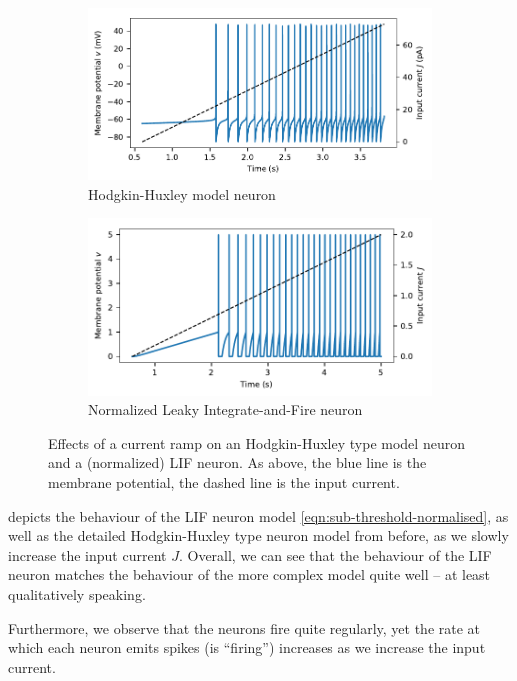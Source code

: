 \documentclass[10pt,letterpaper,oneside]{article}
\begin{document}
\begin{figure}[t]
	\begin{subfigure}{\textwidth}
		\centering
		\includegraphics{media/hh_neuron_ramp.pdf}
		\caption{Hodgkin-Huxley model neuron}
	\end{subfigure}
	\begin{subfigure}{\textwidth}
		\centering
		\includegraphics{media/lif_neuron_ramp.pdf}
		\caption{Normalized Leaky Integrate-and-Fire neuron}
	\end{subfigure}
	\caption{Effects of a current ramp on an Hodgkin-Huxley type model neuron and a (normalized) LIF neuron. As above, the blue line is the membrane potential, the dashed line is the input current.}
	\label{fig:current_ramp}
\end{figure}

 depicts the behaviour of the LIF neuron model \cref{eqn:sub-threshold-normalised}, as well as the detailed Hodgkin-Huxley type neuron model from before, as we slowly increase the input current $J$. Overall, we can see that the behaviour of the LIF neuron matches the behaviour of the more complex model quite well -- at least qualitatively speaking.

Furthermore, we observe that the neurons fire quite regularly, yet the rate at which each neuron emits spikes (is \enquote{firing}) increases as we increase the input current.
\end{document}
